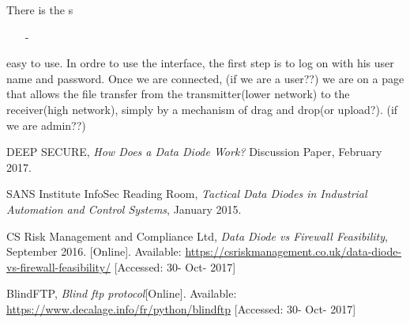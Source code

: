 \documentclass[a4paper,10pt]{article}
\begin{document}
There is the s
\begin{enumerate}
\item[-] 
\end{enumerate}
easy to use. In ordre to use the interface, the first step is to log on with his
user name and password.  Once we are connected, (if we are a user??)
we are on a page that allows the file transfer from the transmitter(lower network)
to the receiver(high network), simply by a mechanism of drag and drop(or upload?).
(if we are admin??)


\begin{thebibliography}{9}


DEEP SECURE,
\textit{How	Does a Data Diode Work?}
Discussion Paper, February 2017.

SANS Institute InfoSec Reading Room,
\textit{Tactical Data Diodes in Industrial Automation and Control Systems}, January 2015.

CS Risk Management and Compliance Ltd,
\textit{Data Diode vs Firewall Feasibility}, September 2016. [Online]. Available: \url{https://csriskmanagement.co.uk/data-diode-vs-firewall-feasibility/} [Accessed: 30- Oct- 2017]

BlindFTP,
\textit{Blind ftp protocol}[Online]. Available: \url{https://www.decalage.info/fr/python/blindftp} [Accessed: 30- Oct- 2017]

\end{thebibliography}
\end{document}
